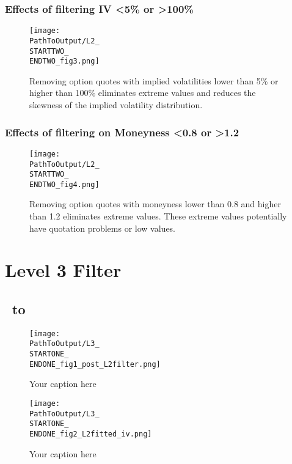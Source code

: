 \begin{appendix}
\subsubsection{Effects of filtering IV <5\% or >100\%}
\begin{figure}[H] %
  \centering
{}
  \texttt{[image: \\PathToOutput/L2\_\\STARTTWO\_\\ENDTWO\_fig3.png]}%
\captionsetup{font=normalfont}
  \caption{Removing option quotes with implied volatilities lower than 5\% or higher than 100\% eliminates extreme values and reduces the skewness of the implied volatility distribution.}
\label{fig:time2lvl2fig3}
\end{figure}


\subsubsection{Effects of filtering on Moneyness <0.8 or >1.2}
\begin{figure}[H] %
  \centering
{}
  \texttt{[image: \\PathToOutput/L2\_\\STARTTWO\_\\ENDTWO\_fig4.png]}%
\captionsetup{font=normalfont}
  \caption{Removing option quotes with moneyness lower than 0.8 and higher than 1.2 eliminates extreme values. These extreme values potentially have quotation problems or low values.}
  \label{fig:time2lvl2fig4}
\end{figure}



\newpage
\section{Level 3 Filter}\label{app:lvl3}
\subsection{\STARTONE\ to \ENDONE }

\begin{figure}[H] %
  \centering
  \texttt{[image: \\PathToOutput/L3\_\\STARTONE\_\\ENDONE\_fig1\_post\_L2filter.png]}%
  \caption{Your caption here}
 \label{fig:time1lvl3fig1}
\end{figure}


\begin{figure}[H] %
  \centering
  \texttt{[image: \\PathToOutput/L3\_\\STARTONE\_\\ENDONE\_fig2\_L2fitted\_iv.png]}%
  \caption{Your caption here}
  \label{fig:time1lvl3fig2}
\end{figure}



\end{appendix}
